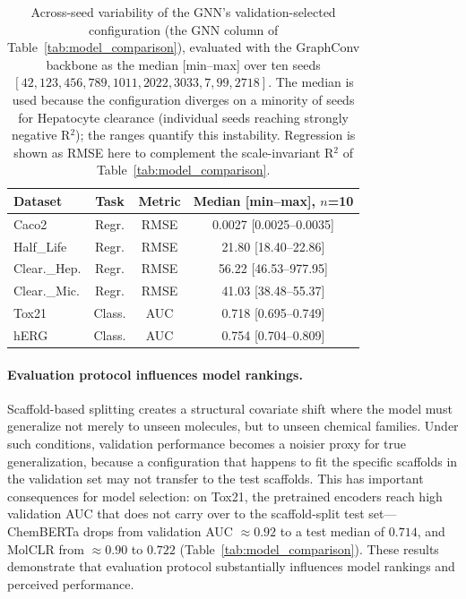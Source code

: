 \documentclass[journal]{IEEEtran}
\begin{document}
\begin{table}[!t]
\centering
\caption{Across-seed variability of the GNN's validation-selected configuration (the GNN column of Table~\ref{tab:model_comparison}), evaluated with the GraphConv backbone as the median [min--max] over ten seeds $[42, 123, 456, 789, 1011, 2022, 3033, 7, 99, 2718]$. The median is used because the configuration diverges on a minority of seeds for Hepatocyte clearance (individual seeds reaching strongly negative R$^2$); the ranges quantify this instability. Regression is shown as RMSE here to complement the scale-invariant R$^2$ of Table~\ref{tab:model_comparison}.}
\label{tab:multiseed}
\small
\setlength{\tabcolsep}{4pt}
\begin{tabular}{lccc}
\toprule
\textbf{Dataset} & \textbf{Task} & \textbf{Metric} & \textbf{Median [min--max], $n$=10} \\
\midrule
Caco2 & Regr. & RMSE & 0.0027 [0.0025--0.0035] \\
Half\_Life & Regr. & RMSE & 21.80 [18.40--22.86] \\
Clear.\_Hep. & Regr. & RMSE & 56.22 [46.53--977.95] \\
Clear.\_Mic. & Regr. & RMSE & 41.03 [38.48--55.37] \\
Tox21 & Class. & AUC & 0.718 [0.695--0.749] \\
hERG & Class. & AUC & 0.754 [0.704--0.809] \\
\bottomrule
\end{tabular}
\end{table}

\paragraph{Evaluation protocol influences model rankings.}
Scaffold-based splitting creates a structural covariate shift where the model must generalize not merely to unseen molecules, but to unseen chemical families. Under such conditions, validation performance becomes a noisier proxy for true generalization, because a configuration that happens to fit the specific scaffolds in the validation set may not transfer to the test scaffolds. This has important consequences for model selection: on Tox21, the pretrained encoders reach high validation AUC that does not carry over to the scaffold-split test set---ChemBERTa drops from validation AUC $\approx 0.92$ to a test median of $0.714$, and MolCLR from $\approx 0.90$ to $0.722$ (Table~\ref{tab:model_comparison}). These results demonstrate that evaluation protocol substantially influences model rankings and perceived performance.
\end{document}

